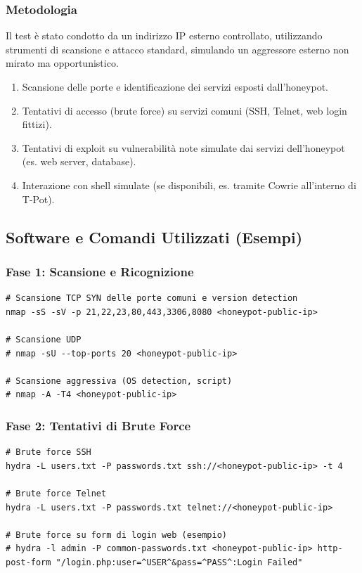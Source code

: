 \documentclass[a4paper,12pt]{report}
\begin{document}
\subsubsection{Metodologia}
\label{subsubsec:metodologia_test}
Il test è stato condotto da un indirizzo IP esterno controllato, utilizzando strumenti di scansione e attacco standard, simulando un aggressore esterno non mirato ma opportunistico.
\begin{enumerate}
    \item Scansione delle porte e identificazione dei servizi esposti dall'honeypot.
    \item Tentativi di accesso (brute force) su servizi comuni (SSH, Telnet, web login fittizi).
    \item Tentativi di exploit su vulnerabilità note simulate dai servizi dell'honeypot (es. web server, database).
    \item Interazione con shell simulate (se disponibili, es. tramite Cowrie all'interno di T-Pot).
\end{enumerate}

\subsection{Software e Comandi Utilizzati (Esempi)}
\label{subsec:sw_comandi_test}

\subsubsection{Fase 1: Scansione e Ricognizione}
\label{subsubsec:fase1_test}
\begin{lstlisting}[caption={Comandi Nmap per la scansione iniziale}, label=lst:nmap_scan]
# Scansione TCP SYN delle porte comuni e version detection
nmap -sS -sV -p 21,22,23,80,443,3306,8080 <honeypot-public-ip>

# Scansione UDP
# nmap -sU --top-ports 20 <honeypot-public-ip>

# Scansione aggressiva (OS detection, script)
# nmap -A -T4 <honeypot-public-ip>
\end{lstlisting}

\subsubsection{Fase 2: Tentativi di Brute Force}
\label{subsubsec:fase2_test}
\begin{lstlisting}[caption={Attacchi di forza bruta con Hydra}, label=lst:hydra_brute]
# Brute force SSH
hydra -L users.txt -P passwords.txt ssh://<honeypot-public-ip> -t 4

# Brute force Telnet
hydra -L users.txt -P passwords.txt telnet://<honeypot-public-ip>

# Brute force su form di login web (esempio)
# hydra -l admin -P common-passwords.txt <honeypot-public-ip> http-post-form "/login.php:user=^USER^&pass=^PASS^:Login Failed"
\end{lstlisting}
\end{document}
